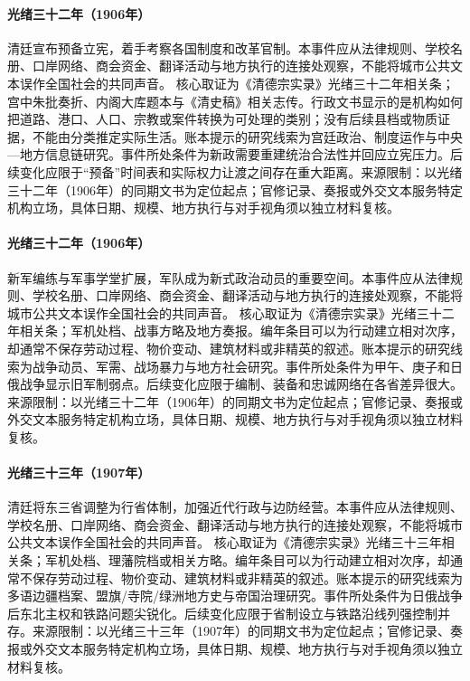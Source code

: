 \hypertarget{civic:EQ-1906-CONSTITUTIONAL-PROMISE}{}\paragraph{光绪三十二年（1906年）}清廷宣布预备立宪，着手考察各国制度和改革官制。本事件应从法律规则、学校名册、口岸网络、商会资金、翻译活动与地方执行的连接处观察，不能将城市公共文本误作全国社会的共同声音。 核心取证为《清德宗实录》光绪三十二年相关条；宫中朱批奏折、内阁大库题本与《清史稿》相关志传。行政文书显示的是机构如何把道路、港口、人口、宗教或案件转换为可处理的类别；没有后续县档或物质证据，不能由分类推定实际生活。账本提示的研究线索为宫廷政治、制度运作与中央—地方信息链研究。事件所处条件为新政需要重建统治合法性并回应立宪压力。后续变化应限于“预备”时间表和实际权力让渡之间存在重大距离。来源限制：以光绪三十二年（1906年）的同期文书为定位起点；官修记录、奏报或外交文本服务特定机构立场，具体日期、规模、地方执行与对手视角须以独立材料复核。
\hypertarget{civic:EQ-1906-NEW-ARMY-REFORM}{}\paragraph{光绪三十二年（1906年）}新军编练与军事学堂扩展，军队成为新式政治动员的重要空间。本事件应从法律规则、学校名册、口岸网络、商会资金、翻译活动与地方执行的连接处观察，不能将城市公共文本误作全国社会的共同声音。 核心取证为《清德宗实录》光绪三十二年相关条；军机处档、战事方略及地方奏报。编年条目可以为行动建立相对次序，却通常不保存劳动过程、物价变动、建筑材料或非精英的叙述。账本提示的研究线索为战争动员、军需、战场暴力与地方社会研究。事件所处条件为甲午、庚子和日俄战争显示旧军制弱点。后续变化应限于编制、装备和忠诚网络在各省差异很大。来源限制：以光绪三十二年（1906年）的同期文书为定位起点；官修记录、奏报或外交文本服务特定机构立场，具体日期、规模、地方执行与对手视角须以独立材料复核。
\hypertarget{civic:EQ-1907-MANCHURIAN-PROVINCES}{}\paragraph{光绪三十三年（1907年）}清廷将东三省调整为行省体制，加强近代行政与边防经营。本事件应从法律规则、学校名册、口岸网络、商会资金、翻译活动与地方执行的连接处观察，不能将城市公共文本误作全国社会的共同声音。 核心取证为《清德宗实录》光绪三十三年相关条；军机处档、理藩院档或相关方略。编年条目可以为行动建立相对次序，却通常不保存劳动过程、物价变动、建筑材料或非精英的叙述。账本提示的研究线索为多语边疆档案、盟旗/寺院/绿洲地方史与帝国治理研究。事件所处条件为日俄战争后东北主权和铁路问题尖锐化。后续变化应限于省制设立与铁路沿线列强控制并存。来源限制：以光绪三十三年（1907年）的同期文书为定位起点；官修记录、奏报或外交文本服务特定机构立场，具体日期、规模、地方执行与对手视角须以独立材料复核。
